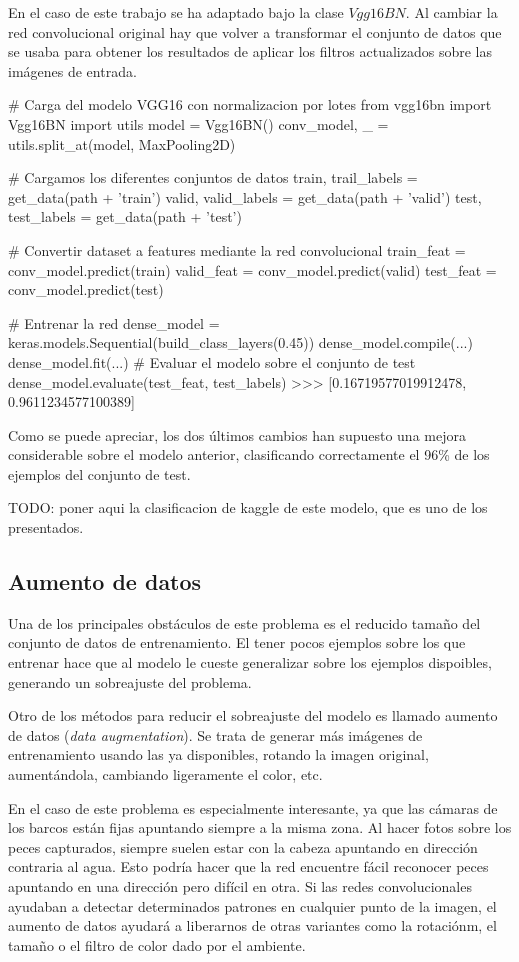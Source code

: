 En el caso de este trabajo se ha adaptado bajo la clase $Vgg16BN$. Al cambiar la red convolucional original hay que volver a transformar el conjunto de datos que se usaba para obtener los resultados de aplicar los filtros actualizados sobre las imágenes de entrada.

\begin{python}
# Carga del modelo VGG16 con normalizacion por lotes
from vgg16bn import Vgg16BN
import utils
model = Vgg16BN()
conv_model, _ = utils.split_at(model, MaxPooling2D)

# Cargamos los diferentes conjuntos de datos
train, trail_labels = get_data(path + 'train')
valid, valid_labels = get_data(path + 'valid')
test, test_labels = get_data(path + 'test')

# Convertir dataset a features mediante la red convolucional 
train_feat = conv_model.predict(train)
valid_feat = conv_model.predict(valid)
test_feat = conv_model.predict(test)

# Entrenar la red
dense_model = keras.models.Sequential(build_class_layers(0.45))
dense_model.compile(...)
dense_model.fit(...)
# Evaluar el modelo sobre el conjunto de test
dense_model.evaluate(test_feat, test_labels)
>>> [0.16719577019912478, 0.9611234577100389]
\end{python}

Como se puede apreciar, los dos últimos cambios han supuesto una mejora considerable sobre el modelo anterior, clasificando correctamente el 96\% de los ejemplos del conjunto de test.

TODO: poner aqui la clasificacion de kaggle de este modelo, que es uno de los presentados.


\subsection{Aumento de datos}

Una de los principales obstáculos de este problema es el reducido tamaño del conjunto de datos de entrenamiento. El tener pocos ejemplos sobre los que entrenar hace que al modelo le cueste generalizar sobre los ejemplos dispoibles, generando un sobreajuste del problema.

Otro de los métodos para reducir el sobreajuste del modelo es llamado aumento de datos (\textit{data augmentation}). Se trata de generar más imágenes de entrenamiento usando las ya disponibles, rotando la imagen original, aumentándola, cambiando ligeramente el color, etc. 

En el caso de este problema es especialmente interesante, ya que las cámaras de los barcos están fijas apuntando siempre a la misma zona. Al hacer fotos sobre los peces capturados, siempre suelen estar con la cabeza apuntando en dirección contraria al agua. Esto podría hacer que la red encuentre fácil reconocer peces apuntando en una dirección pero difícil en otra. Si las redes convolucionales ayudaban a detectar determinados patrones en cualquier punto de la imagen, el aumento de datos ayudará a liberarnos de otras variantes como la rotaciónm, el tamaño o el filtro de color dado por el ambiente.

